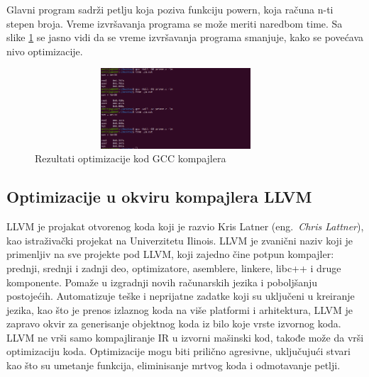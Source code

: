 \documentclass[a4paper]{article}
\begin{document}
Glavni program sadrži petlju koja poziva funkciju powern, koja računa n-ti stepen broja. Vreme izvršavanja programa se može meriti naredbom time. Sa slike \ref{fig:Rezultati_optimizacije} se jasno vidi da se vreme izvršavanja programa smanjuje, kako se povećava nivo optimizacije.

\begin{figure}[h!]
    \begin{center}
        \includegraphics[width=105mm, height=30mm]{pics/test.png}
    \end{center}
    \caption {Rezultati optimizacije kod GCC kompajlera}
    \label{fig:Rezultati_optimizacije}

\end{figure}


\subsection{Optimizacije u okviru kompajlera LLVM}
\label{subsec:optimizacijeLLVM}

LLVM je projakat otvorenog koda koji je razvio Kris Latner (eng.~{\em Chris Lattner}), kao istraživački projekat na Univerzitetu Ilinois. LLVM je zvanični naziv koji je primenljiv na sve projekte pod LLVM, koji zajedno čine potpun kompajler: prednji, srednji i zadnji deo, optimizatore, asemblere, linkere, libc++ i druge komponente. Pomaže u izgradnji novih računarskih jezika i poboljšanju postojećih. Automatizuje teške i neprijatne zadatke koji su uključeni u kreiranje jezika, kao što je prenos izlaznog koda na više platformi i arhitektura, LLVM je zapravo okvir za generisanje objektnog koda iz bilo koje vrste izvornog koda. LLVM ne vrši samo kompajliranje IR u izvorni mašinski kod, takođe može da vrši optimizaciju koda. Optimizacije mogu biti prilično agresivne, uključujući stvari kao što su umetanje funkcija, eliminisanje mrtvog koda i odmotavanje petlji. \cite{llvm1} \cite{gccVsClang}
\end{document}

